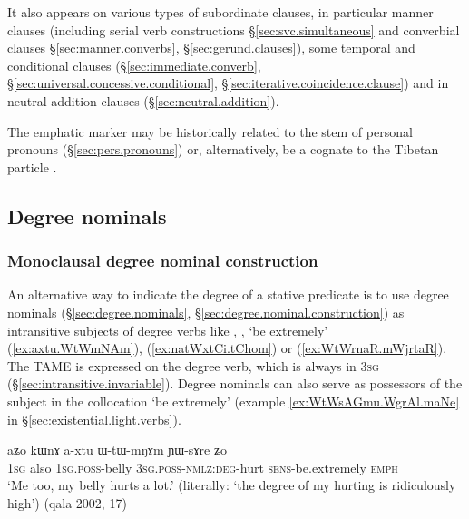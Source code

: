 It also appears on various types of subordinate clauses, in particular manner clauses (including serial verb constructions §\ref{sec:svc.simultaneous} and converbial clauses §\ref{sec:manner.converbs}, §\ref{sec:gerund.clauses}), some temporal and conditional clauses (§\ref{sec:immediate.converb}, §\ref{sec:universal.concessive.conditional}, §\ref{sec:iterative.coincidence.clause}) and in neutral addition clauses  (§\ref{sec:neutral.addition}).

The emphatic marker may be historically related to the  stem of personal pronouns (§\ref{sec:pers.pronouns}) or, alternatively, be a cognate to the Tibetan particle .

\subsection{Degree nominals} \label{sec:degree.nominal.subject}

\subsubsection{Monoclausal degree nominal construction} \label{sec:degree.monoclausal}
An alternative way to indicate the degree of a stative predicate is to use degree nominals (§\ref{sec:degree.nominals}, §\ref{sec:degree.nominal.construction}) as intransitive subjects of degree verbs like , , `be extremely' (\ref{ex:axtu.WtWmNAm}),  (\ref{ex:natWxtCi.tChom}) or  (\ref{ex:WtWrnaR.mWjrtaR}). The TAME is expressed on the degree verb, which is always in \textsc{3sg} (§\ref{sec:intransitive.invariable}). Degree nominals can also serve as possessors of the subject   in the collocation  `be extremely' (example \ref{ex:WtWsAGmu.WgrAl.maNe} in §\ref{sec:existential.light.verbs}). 

\begin{exe}
\ex \label{ex:axtu.WtWmNAm}
\gll aʑo kɯnɤ a-xtu ɯ-tɯ-mŋɤm ɲɯ-sɤre ʑo \\
\textsc{1sg} also \textsc{1sg}.\textsc{poss}-belly \textsc{3sg}.\textsc{poss}-\textsc{nmlz}:\textsc{deg}-hurt \textsc{sens}-be.extremely \textsc{emph} \\
\glt `Me too, my belly hurts a lot.' (literally: `the degree of my hurting is ridiculously high') (qala 2002, 17)
\end{exe}


